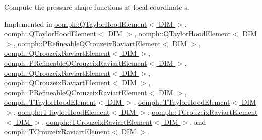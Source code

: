 Compute the pressure shape functions at local coordinate s. 



Implemented in \hyperlink{classoomph_1_1QTaylorHoodElement_abc75cdb4d6a56f9def855c04b7c912fd}{oomph\+::\+Q\+Taylor\+Hood\+Element$<$ D\+I\+M $>$}, \hyperlink{classoomph_1_1QTaylorHoodElement_a3638aa1e57ea83073b61f7b4bdd57c80}{oomph\+::\+Q\+Taylor\+Hood\+Element$<$ D\+I\+M $>$}, \hyperlink{classoomph_1_1QTaylorHoodElement_a791d591c9dbcc18f5843dd0df3a5210c}{oomph\+::\+Q\+Taylor\+Hood\+Element$<$ D\+I\+M $>$}, \hyperlink{classoomph_1_1PRefineableQCrouzeixRaviartElement_a556b7533944abd5eedce664d708b4eae}{oomph\+::\+P\+Refineable\+Q\+Crouzeix\+Raviart\+Element$<$ D\+I\+M $>$}, \hyperlink{classoomph_1_1QCrouzeixRaviartElement_aec2e85c8a3d6fcd64f7f4f8f8028f893}{oomph\+::\+Q\+Crouzeix\+Raviart\+Element$<$ D\+I\+M $>$}, \hyperlink{classoomph_1_1PRefineableQCrouzeixRaviartElement_a87afeb50892736eace1e3d68d6c53172}{oomph\+::\+P\+Refineable\+Q\+Crouzeix\+Raviart\+Element$<$ D\+I\+M $>$}, \hyperlink{classoomph_1_1QCrouzeixRaviartElement_a34e6743118c6e0c14733de53e66c2ea1}{oomph\+::\+Q\+Crouzeix\+Raviart\+Element$<$ D\+I\+M $>$}, \hyperlink{classoomph_1_1QCrouzeixRaviartElement_a122c4b7ae47df08a07acd2f1ed6f61b0}{oomph\+::\+Q\+Crouzeix\+Raviart\+Element$<$ D\+I\+M $>$}, \hyperlink{classoomph_1_1PRefineableQCrouzeixRaviartElement_a19222e5c997c7ce4a30452d9aab12ad0}{oomph\+::\+P\+Refineable\+Q\+Crouzeix\+Raviart\+Element$<$ D\+I\+M $>$}, \hyperlink{classoomph_1_1TTaylorHoodElement_ac060f5a09eb0fe6e0d3db255fa8cbceb}{oomph\+::\+T\+Taylor\+Hood\+Element$<$ D\+I\+M $>$}, \hyperlink{classoomph_1_1TTaylorHoodElement_a38f381e73312dd3659a3f5fa1c18e2dd}{oomph\+::\+T\+Taylor\+Hood\+Element$<$ D\+I\+M $>$}, \hyperlink{classoomph_1_1TTaylorHoodElement_a78814850aa0ff675479394d0dda7d1e8}{oomph\+::\+T\+Taylor\+Hood\+Element$<$ D\+I\+M $>$}, \hyperlink{classoomph_1_1TCrouzeixRaviartElement_a00b50ccb04f8c64a3764e0cb022a1475}{oomph\+::\+T\+Crouzeix\+Raviart\+Element$<$ D\+I\+M $>$}, \hyperlink{classoomph_1_1TCrouzeixRaviartElement_a70b147d8e7790e037d418b703ba4dc31}{oomph\+::\+T\+Crouzeix\+Raviart\+Element$<$ D\+I\+M $>$}, and \hyperlink{classoomph_1_1TCrouzeixRaviartElement_aed5a8e922aff987b4edcad608732be2b}{oomph\+::\+T\+Crouzeix\+Raviart\+Element$<$ D\+I\+M $>$}.

\mbox{\label{classoomph_1_1NavierStokesEquations_a55f96a5c9f985476aeb145f683d63001}} 

